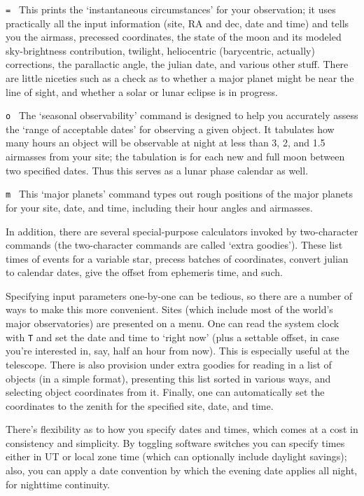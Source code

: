 \item{\tt = } This prints the `instantaneous circumstances' for your
observation; it uses practically all the input information (site, RA and dec,
date and time) and tells you the airmass, precessed coordinates, the state
of the moon and its modeled sky-brightness contribution, twilight,
heliocentric (barycentric, actually) corrections, the parallactic angle,
the julian date, and various other stuff.  There are little niceties
such as a check as to whether a major planet might be near the line of
sight, and whether a solar or lunar eclipse is in progress.

\item{\tt o } The `seasonal observability' command is designed to help
you accurately assess the `range of acceptable dates' for observing a 
given object.  It tabulates how many hours an object will be observable
at night at less than 3, 2, and 1.5 airmasses from your site; the 
tabulation is for each new and full moon between two specified dates.
Thus this serves as a lunar phase calendar as well.

\item{\tt m } This `major planets' command types out rough positions of 
the major planets for your site, date, and time, including their
hour angles and airmasses.  

In addition, there are several special-purpose calculators invoked by
two-character commands 
(the two-character commands are called `extra goodies').  These list
times of events for a variable star, precess batches of coordinates,
convert julian to calendar dates, give the offset from ephemeris
time, and such.

Specifying input parameters one-by-one can be tedious, so there are a
number of ways to make this more convenient.  Sites (which include
most of the world's major observatories) are presented
on a menu.  One can read the
system clock with {\tt T} and set the date and time to `right now'
(plus a settable offset, in case you're interested in, say,
half an hour from now).  This is especially useful at the telescope.
There is also provision under extra goodies
for reading in a list
of objects (in a simple format), presenting this list sorted in
various ways, and selecting object coordinates from it.  
Finally, one can automatically 
set the coordinates to the zenith for the specified site, date,
and time.

There's flexibility as to how you specify dates and times, which
comes at a cost in consistency and simplicity.  By toggling
software switches you can specify times either in UT or local zone time
(which can optionally include daylight savings); also, you can
apply a date convention by which the evening date applies all night,
for nighttime continuity.
 
